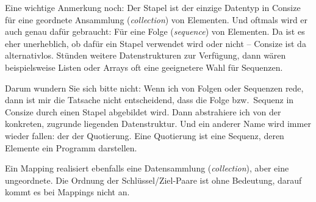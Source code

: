 
Eine wichtige Anmerkung noch: Der Stapel ist der einzige Datentyp in Consize für eine geordnete Ansammlung (\emph{collection}) von Elementen. Und oftmals wird er auch genau dafür gebraucht: Für eine Folge (\emph{sequence}) von Elementen. Da ist es eher unerheblich, ob dafür ein Stapel verwendet wird oder nicht -- Consize ist da alternativlos. Stünden weitere Datenstrukturen zur Verfügung, dann wären beispielsweise Listen oder Arrays oft eine geeignetere Wahl für Sequenzen.

Darum wundern Sie sich bitte nicht: Wenn ich von Folgen oder Sequenzen rede, dann ist mir die Tatsache nicht entscheidend, dass die Folge bzw.\ Sequenz in Consize durch einen Stapel abgebildet wird. Dann abstrahiere ich von der konkreten, zugrunde liegenden Datenstruktur. Und ein anderer Name wird immer wieder fallen: der der Quotierung. Eine Quotierung ist eine Sequenz, deren Elemente ein Programm darstellen.

Ein Mapping realisiert ebenfalls eine Datensammlung (\emph{collection}), aber eine ungeordnete. Die Ordnung der Schlüssel/Ziel-Paare ist ohne Bedeutung, darauf kommt es bei Mappings nicht an.
